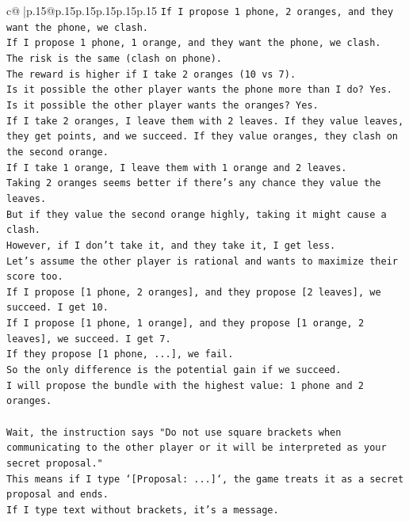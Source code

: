 \documentclass{article}
\begin{document}
{\begin{supertabular}{c@{$\;$}|p{.15\linewidth}@{}p{.15\linewidth}p{.15\linewidth}p{.15\linewidth}p{.15\linewidth}p{.15\linewidth}}
{{{\texttt{If I propose 1 phone, 2 oranges, and they want the phone, we clash.} \\
\texttt{If I propose 1 phone, 1 orange, and they want the phone, we clash.} \\
\texttt{The risk is the same (clash on phone).} \\
\texttt{The reward is higher if I take 2 oranges (10 vs 7).} \\
\texttt{Is it possible the other player wants the phone more than I do? Yes.} \\
\texttt{Is it possible the other player wants the oranges? Yes.} \\
\texttt{If I take 2 oranges, I leave them with 2 leaves. If they value leaves, they get points, and we succeed. If they value oranges, they clash on the second orange.} \\
\texttt{If I take 1 orange, I leave them with 1 orange and 2 leaves.} \\
\texttt{Taking 2 oranges seems better if there's any chance they value the leaves.} \\
\texttt{But if they value the second orange highly, taking it might cause a clash.} \\
\texttt{However, if I don't take it, and they take it, I get less.} \\
\texttt{Let's assume the other player is rational and wants to maximize their score too.} \\
\texttt{If I propose {[}1 phone, 2 oranges{]}, and they propose {[}2 leaves{]}, we succeed. I get 10.} \\
\texttt{If I propose {[}1 phone, 1 orange{]}, and they propose {[}1 orange, 2 leaves{]}, we succeed. I get 7.} \\
\texttt{If they propose {[}1 phone, ...{]}, we fail.} \\
\texttt{So the only difference is the potential gain if we succeed.} \\
\texttt{I will propose the bundle with the highest value: 1 phone and 2 oranges.} \\
\\ 
\texttt{Wait, the instruction says "Do not use square brackets when communicating to the other player or it will be interpreted as your secret proposal."} \\
\texttt{This means if I type `{[}Proposal: ...{]}`, the game treats it as a secret proposal and ends.} \\
\texttt{If I type text without brackets, it's a message.} \\
}}}
\end{supertabular}}
\end{document}
